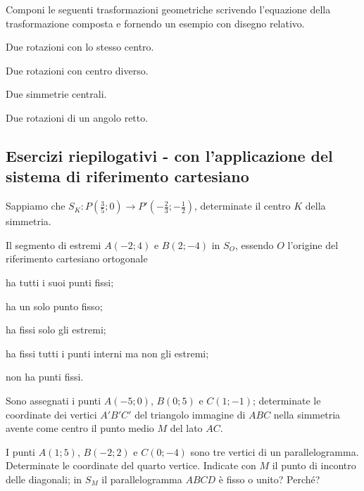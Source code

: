 \begin{esercizio}
\label{ese:8.100} %
Componi le seguenti trasformazioni geometriche scrivendo l'equazione 
della trasformazione composta e fornendo un esempio con disegno 
relativo. 
\begin{enumeratea}
\item Due rotazioni con lo stesso centro.
\item Due rotazioni con centro diverso.
\item Due simmetrie centrali.
\item Due rotazioni di un angolo retto.
\end{enumeratea}
\end{esercizio}


\subsection{Esercizi riepilogativi - con l'applicazione del sistema di riferimento cartesiano}

\begin{esercizio}
	\label{ese:8.7}
	Sappiamo che \(S_K:P\left(\frac{3}{5};0\right) \rightarrow 
	P'\left(-\frac{2}{3};-\frac{1}{2}\right)\), determinate il centro \(K\) 
	della simmetria. 
\end{esercizio}

\begin{esercizio}
	\label{ese:8.8}
	Il segmento di estremi \(A(-2;4)\) e \(B(2;-4)\) in \(S_O\), essendo \(O\) 
	l'origine del riferimento cartesiano ortogonale
	\begin{enumeratea}
		\item ha tutti i suoi punti fissi;
		\item ha un solo punto fisso;
		\item ha fissi solo gli estremi;
		\item ha fissi tutti i punti interni ma non gli estremi;
		\item non ha punti fissi.
	\end{enumeratea}
\end{esercizio}

\begin{esercizio}
	\label{ese:8.9}
	Sono assegnati i punti \(A(-5;0)\), \(B(0;5)\) e \(C(1;-1)\); determinate 
	le coordinate dei vertici \(A'B'C'\) del triangolo immagine di \(ABC\) 
	nella simmetria avente come centro il punto medio \(M\) del lato \(AC\).
\end{esercizio}

\begin{esercizio}
	\label{ese:8.10}
	I punti \(A(1;5)\), \(B(-2;2)\) e \(C(0;-4)\) sono tre vertici di un 
	parallelogramma. Determinate le coordinate del quarto vertice. 
	Indicate con \(M\) il punto di incontro delle diagonali; in \(S_M\) il 
	parallelogramma \(ABCD\) è fisso o unito? Perché?
\end{esercizio}

